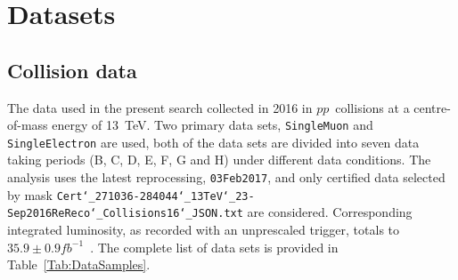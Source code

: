 \section{Datasets}
\label{Sec:Datasets}
%
\subsection{Collision data}
%
The data used in the present search collected in 2016 in $pp$~collisions at a centre-of-mass energy of 13~TeV. Two primary data sets, \texttt{SingleMuon} and \texttt{SingleElectron} are used, both of the data sets are divided into seven data taking periods (B, C, D, E, F, G and H) under different data conditions.
The analysis uses the latest reprocessing, \texttt{03Feb2017}, and only certified data selected by mask \texttt{Cert\char`_271036-284044\char`_13TeV\char`_23-}\\ \texttt{Sep2016ReReco\char`_Collisions16\char`_JSON.txt} are considered.
Corresponding integrated luminosity, as recorded with an unprescaled trigger, totals to $35.9 \pm 0.9fb^{-1}$~\cite{CMS-PAS-LUM-17-001}.
The complete list of data sets is provided in Table~\ref{Tab:DataSamples}.
